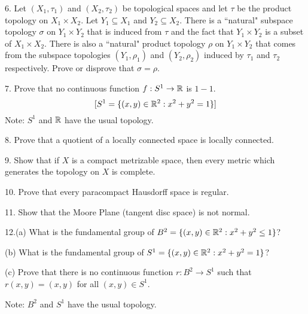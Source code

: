 \documentclass[10pt]{article}
\begin{document}
\begin{large}
\begin{description}
\item 6.
Let $(X_1,\tau_1)$ and $(X_2,\tau_2)$ be topological spaces and let $\tau$
be the product topology on $X_1\times X_2$.
Let $Y_1\subseteq X_1$ and $Y_2\subseteq X_2$.
There is a ``natural" subspace topology $\sigma$ on $Y_1\times Y_2$ that
is induced from $\tau$ and the fact that $Y_1\times Y_2$ is a subset of
$X_1\times X_2$.
There is also a ``natural" product topology $\rho$ on $Y_1\times Y_2$
that comes from the subspace topologies $(Y_1,\rho_1)$
and $(Y_2,\rho_2)$ induced by $\tau_1$ and $\tau_2$ respectively.
Prove or disprove that $\sigma=\rho$.


\item 7.
Prove that no continuous function $f:S^1\to{\mathbb R}$ is $1-1$.
$$[S^1=\{(x,y)\in{\mathbb R}^2:x^2+y^2=1\}]$$
Note: $S^1$ and ${\mathbb R}$ have the usual topology.

\item 8.
Prove that a quotient of a locally connected space is locally connected.

\item 9.
Show that if $X$ is a compact metrizable space, then every metric
which generates the topology on $X$ is complete.

\item 10.
Prove that every paracompact Hausdorff space is regular.

\item 11.
Show that the Moore Plane (tangent disc space) is not normal.

\item 12.(a)
What is the fundamental group of $B^2=\{(x,y)\in{\mathbb R}^2: x^2+y^2\leq 1\}$?

\item \quad (b)
What is the fundamental group of $S^1=\{(x,y)\in {\mathbb R}^2:x^2+y^2=1\}$?

\item \quad (c)
Prove that there is no continuous function $r:B^2\to S^1$ such that
\newline $r(x,y)=(x,y)$ for all $(x,y)\in S^1$.

Note: $B^2$ and $S^1$ have the usual topology.

\end{description}
\end{large}
\end{document}
